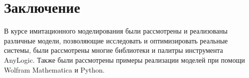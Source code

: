 \section*{Заключение}

В курсе имитационного моделирования были рассмотрены и реализованы различные модели, позволяющие исследовать и оптимизировать реальные системы, были рассмотрены многие библиотеки и палитры инструмента AnyLogic. Также были рассмотрены примеры реализации моделей при помощи Wolfram Mathematica и Python.